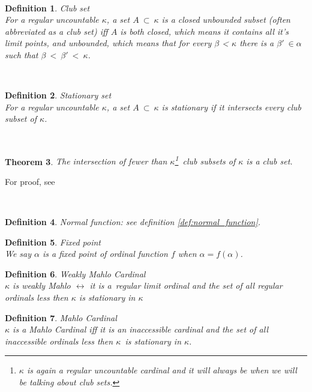\documentclass[12pt,a4paper]{article}
\newtheorem{theorem}{Theorem}[section]
\newtheorem{definition}[theorem]{Definition}
\renewcommand{\iff}{\leftrightarrow}
\begin{document}
\

\begin{definition}{Club set}\\
For a regular uncountable $\kappa$, a set $A\ \subset\ \kappa$ is a \emph{closed unbounded} subset (often abbreviated as a \emph{club set}) iff $A$ is both closed, which means it contains all it's limit points, and unbounded, which means that for every $\beta$ < $\kappa$ there is a $\beta'\ \in \alpha$ such that $\beta\ <\ \beta'\ <\ \kappa$.
\end{definition}

\

\begin{definition}{Stationary set}\\
For a regular uncountable $\kappa$, a set $A\ \subset\ \kappa$ is stationary if it intersects every club subset of $\kappa$.
\end{definition}

\

\begin{theorem}{}\label{club_intersection} 
The intersection of fewer than $\kappa$\footnote{$\kappa$ is again a regular uncountable cardinal and it will always be when we will be talking about club sets.} club subsets of $\kappa$ is a club set.
\end{theorem}
For proof, see \cite[Theorem 8.3]{JechBook}

\

\begin{definition}{Normal function}: see definition \ref{def:normal_function}.
\end{definition}

\begin{definition}{Fixed point}\\
We say $\alpha$ is a fixed point of ordinal function $f$ when $\alpha=f(\alpha)$.
\end{definition}

\begin{definition}{Weakly Mahlo Cardinal}\label{def:weakly_mahlo}\\
$\kappa$ is \emph{weakly Mahlo} $\iff$ it is a~regular limit ordinal and the set of all regular ordinals less then $\kappa$ is stationary in $\kappa$
\end{definition}

\begin{definition}{Mahlo Cardinal}\label{def:mahlo_cardinal}\\
$\kappa$ is a \emph{Mahlo Cardinal} iff it is an inaccessible cardinal and the set of all inaccessible ordinals less then $\kappa$ is stationary in $\kappa$.
\end{definition}
\end{document}

